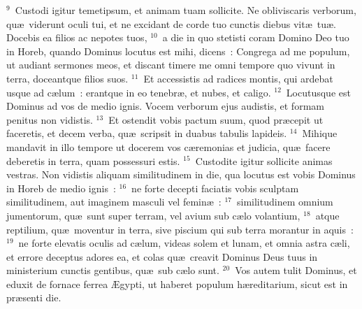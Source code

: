 ${}^{9}$~Custodi igitur temetipsum, et animam tuam sollicite. Ne obliviscaris verborum, qu\ae\ viderunt oculi tui, et ne excidant de corde tuo cunctis diebus vit\ae\ tu\ae . Docebis ea filios ac nepotes tuos,
${}^{10}$~a die in quo stetisti coram Domino Deo tuo in Horeb, quando Dominus locutus est mihi, dicens~: Congrega ad me populum, ut audiant sermones meos, et discant timere me omni tempore quo vivunt in terra, doceantque filios suos.
${}^{11}$~Et accessistis ad radices montis, qui ardebat usque ad c\ae lum~: erantque in eo tenebr\ae , et nubes, et caligo.
${}^{12}$~Locutusque est Dominus ad vos de medio ignis. Vocem verborum ejus audistis, et formam penitus non vidistis.
${}^{13}$~Et ostendit vobis pactum suum, quod pr\ae cepit ut faceretis, et decem verba, qu\ae\ scripsit in duabus tabulis lapideis.
${}^{14}$~Mihique mandavit in illo tempore ut docerem vos c\ae remonias et judicia, qu\ae\ facere deberetis in terra, quam possessuri estis.
${}^{15}$~Custodite igitur sollicite animas vestras. Non vidistis aliquam similitudinem in die, qua locutus est vobis Dominus in Horeb de medio ignis~:
${}^{16}$~ne forte decepti faciatis vobis sculptam similitudinem, aut imaginem masculi vel femin\ae~:
${}^{17}$~similitudinem omnium jumentorum, qu\ae\ sunt super terram, vel avium sub c\ae lo volantium,
${}^{18}$~atque reptilium, qu\ae\ moventur in terra, sive piscium qui sub terra morantur in aquis~:
${}^{19}$~ne forte elevatis oculis ad c\ae lum, videas solem et lunam, et omnia astra c\ae li, et errore deceptus adores ea, et colas qu\ae\ creavit Dominus Deus tuus in ministerium cunctis gentibus, qu\ae\ sub c\ae lo sunt.
${}^{20}$~Vos autem tulit Dominus, et eduxit de fornace ferrea \AE gypti, ut haberet populum h\ae reditarium, sicut est in pr\ae senti die.


